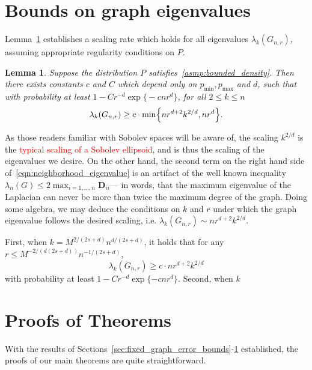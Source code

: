 \documentclass{article}
\newcommand{\1}{\mathbf{1}}
\theoremstyle{alden}
\theoremstyle{aldenthm}
\newtheorem{lemma}{Lemma}
\theoremstyle{definition}
\theoremstyle{remark}
\begin{document}
\section{Bounds on graph eigenvalues}
\label{sec:graph_eigenvalues}
Lemma~\ref{lem:neighborhood_eigenvalue} establishes a scaling rate which holds for all eigenvalues $\lambda_{k}(G_{n,r})$, assuming appropriate regularity conditions on $P$.
\begin{lemma}
	\label{lem:neighborhood_eigenvalue}
	Suppose the distribution $P$ satisfies~\ref{asmp:bounded_density}. Then there exists constants $c$ and $C$ which depend only on $p_{\min}, p_{\max}$ and $d$, such that with probability at least $1 - C r^{-d} \exp\bigl\{- c n r^d\bigr\}$, for all $2 \leq k \leq n$
	\begin{equation}
	\label{eqn:neighborhood_eigenvalue}
	\lambda_k(G_{n,r}) \geq c \cdot \min\Bigl\{nr^{d + 2}k^{2/d}, nr^d\Bigr\}.
	\end{equation}	
\end{lemma}
As those readers familiar with Sobolev spaces will be aware of, the scaling $k^{2/d}$ is the \textcolor{red}{typical scaling of a Sobolev ellipsoid}, and is thus the scaling of the eigenvalues we desire. On the other hand, the second term on the right hand side of~\eqref{eqn:neighborhood_eigenvalue} is an artifact of the well known inequality $\lambda_n(G) \leq 2 \max_{i = 1,\ldots,n} \mathbf{D}_{ii}$--- in words, that the maximum eigenvalue of the Laplacian can never be more than twice the maximum degree of the graph. Doing some algebra, we may deduce the conditions on $k$ and $r$ under which the graph eigenvalue follows the desired scaling, i.e. $\lambda_k(G_{n,r}) \sim n r^{d + 2}k^{2/d}$. 

First, when $k = M^{2/(2s + d)} n^{d/(2s + d)}$, it holds that for any $r \leq M^{-2/(d(2s +d))} n^{-1/(2s + d)}$, 
\begin{equation}
\label{eqn:neighborhood_eigenvalue_1}
\lambda_{k}(G_{n,r}) \geq c \cdot nr^{d+2}{k}^{2/d}
\end{equation}
with probability at least $1 - C r^{-d} \exp\{- c n r^d\}$. Second, when $k$


\section{Proofs of Theorems}
\label{sec:proofs_theorems}
With the results of Sections~\ref{sec:fixed_graph_error_bounds}-\ref{sec:graph_eigenvalues} established, the proofs of our main theorems are quite straightforward.
\end{document}
